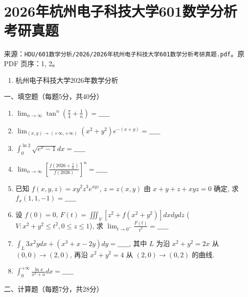 \documentclass[11pt,fontset=fandol]{ctexart}
\providecommand{\tightlist}{\setlength{\itemsep}{0pt}\setlength{\parskip}{0pt}}
\begin{document}
\section{2026年杭州电子科技大学601数学分析考研真题}\label{ux5e74ux676dux5ddeux7535ux5b50ux79d1ux6280ux5927ux5b66601ux6570ux5b66ux5206ux6790ux8003ux7814ux771fux9898}

来源：\texttt{HDU/601数学分析/2026/2026年杭州电子科技大学601数学分析考研真题.pdf}。原
PDF 页序：1, 2。

\begin{enumerate}
\def\labelenumi{\arabic{enumi}.}
\setcounter{enumi}{2}
\tightlist
\item
  杭州电子科技大学2026年数学分析
\end{enumerate}

一、填空题（每题5分，共40分）

\begin{enumerate}
\def\labelenumi{\arabic{enumi}.}
\item
  \(\lim_{n \to \infty} \tan^n \left( \frac{\pi}{4} + \frac{1}{n} \right) = \_\_\_\_\_\)
\item
  \(\lim_{(x,y) \to (+\infty,+\infty)} \left( x^2 + y^2 \right) e^{-(x+y)} = \_\_\_\_\_\)
\item
  \(\int_0^{\ln 2} \sqrt{e^x - 1} dx = \_\_\_\_\_\)
\item
  \(\lim_{n \to \infty} \left[ \frac{f\left( 2026 + \frac{1}{n} \right)}{f(2026)} \right]^n = \_\_\_\_\_\)
\item
  已知 \(f(x,y,z) = xy^2 z^3 e^{xyz}\), \(z = z(x,y)\) 由
  \(x+y+z+xyz=0\) 确定, 求 \(f_x(1,1,-1) = \_\_\_\_\_\)
\item
  设 \(f(0) = 0\),
  \(F(t) = \iiint_V \left[ z^2 + f(x^2 + y^2) \right] dxdydz\)
  (\(V: x^2 + y^2 \leq t^2, 0 \leq z \leq 1\)), 求
  \(\lim_{t \to 0^+} \frac{F(t)}{t^2} = \_\_\_\_\_\)
\item
  \(\int_L 3x^2 y dx + (x^3 + x - 2y) dy = \_\_\_\_\_\), 其中 \(L\) 为沿
  \(x^2 + y^2 = 2x\) 从 \((0,0) \to (2,0)\), 再沿 \(x^2 + y^2 = 4\) 从
  \((2,0) \to (0,2)\) 的曲线.
\item
  \(\int_0^{+\infty} \frac{\ln x}{x^2 + a} dx = \_\_\_\_\_\)
\end{enumerate}

二、计算题（每题7分，共28分）
\end{document}
